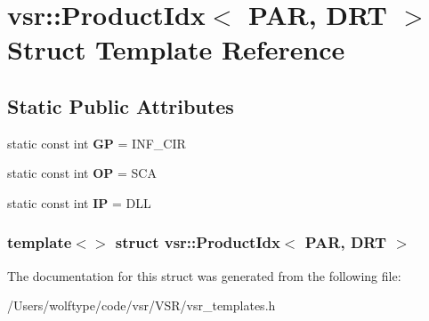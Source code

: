 \hypertarget{structvsr_1_1_product_idx_3_01_p_a_r_00_01_d_r_t_01_4}{\section{vsr\-:\-:Product\-Idx$<$ P\-A\-R, D\-R\-T $>$ Struct Template Reference}
\label{structvsr_1_1_product_idx_3_01_p_a_r_00_01_d_r_t_01_4}
}
\subsection*{Static Public Attributes}
\begin{DoxyCompactItemize}
\item 
\hypertarget{structvsr_1_1_product_idx_3_01_p_a_r_00_01_d_r_t_01_4_a5bb9094835d2834d5a1ccaaf0f93b124}{static const int {\bfseries G\-P} = I\-N\-F\-\_\-\-C\-I\-R}\label{structvsr_1_1_product_idx_3_01_p_a_r_00_01_d_r_t_01_4_a5bb9094835d2834d5a1ccaaf0f93b124}

\item 
\hypertarget{structvsr_1_1_product_idx_3_01_p_a_r_00_01_d_r_t_01_4_abd0ec5f6e821dfd256fc955b98443f4a}{static const int {\bfseries O\-P} = S\-C\-A}\label{structvsr_1_1_product_idx_3_01_p_a_r_00_01_d_r_t_01_4_abd0ec5f6e821dfd256fc955b98443f4a}

\item 
\hypertarget{structvsr_1_1_product_idx_3_01_p_a_r_00_01_d_r_t_01_4_a30eed7f7d6c02e68b59bed1dfd9bfea9}{static const int {\bfseries I\-P} = D\-L\-L}\label{structvsr_1_1_product_idx_3_01_p_a_r_00_01_d_r_t_01_4_a30eed7f7d6c02e68b59bed1dfd9bfea9}

\end{DoxyCompactItemize}
\subsubsection*{template$<$$>$ struct vsr\-::\-Product\-Idx$<$ P\-A\-R, D\-R\-T $>$}



The documentation for this struct was generated from the following file\-:\begin{DoxyCompactItemize}
\item 
/\-Users/wolftype/code/vsr/\-V\-S\-R/vsr\-\_\-templates.\-h\end{DoxyCompactItemize}

